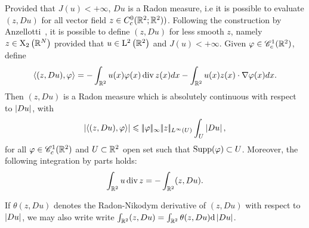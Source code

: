 Provided that $J(u)<+\infty$, $Du$ is a Radon measure, i.e  it is possible to evaluate $(z,Du)$ for all vector field $z\in C_c^0(\mathbb{R}^2; \mathbb{R}^2))$.
Following the construction by Anzellotti~\cite{Anzellotti}, it is possible to define $(z,Du)$ for less smooth $z$, namely $z\in \mathrm{X}_2\left(\mathbb{R}^N\right)$ provided that $u\in \mathrm{L}^2\left(\mathbb{R}^2\right)$ and $J(u)<+\infty$. Given $\varphi\in \mathscr{C}^{1}_c(\mathbb{R}^2)$, define
\begin{align*}
  \langle (z,Du), \varphi \rangle= -\int_{\mathbb{R}^2} u(x)\varphi(x) \operatorname{div} z(x)dx - \int_{\mathbb{R}^2} u(x)z(x)\cdot \nabla \varphi(x)dx.
\end{align*}
Then $(z,Du)$ is a Radon measure which is absolutely continuous with respect to $\left| Du \right|$, with 
\begin{equation*}
  \left| \langle (z,Du),\varphi\rangle \right| \leqslant |\!| \varphi |\!|_{\infty}|\!| z |\!|_{L^\infty(U)} \int_U \left| Du \right|,
\end{equation*}
for all $\varphi\in \mathscr{C}^{1}_c(\mathbb{R}^2)$ and $U\subset \mathbb{R}^2$ open set such that $\operatorname{Supp}(\varphi)\subset U$. Moreover, the following integration by parts holds:
\begin{equation*}
  \int_{\mathbb{R}^2}u\operatorname{div} z = -\int_{\mathbb{R}^2}(z,Du).
\end{equation*}

If $\theta(z,Du)$ denotes the Radon-Nikodym derivative of $(z,Du)$ with respect to $\left| Du \right|$, we may also write write $\int_{\mathbb{R}^2}(z,Du)=\int_{\mathbb{R}^2}\theta(z,Du)\mathrm{d} \left| Du \right|$.



